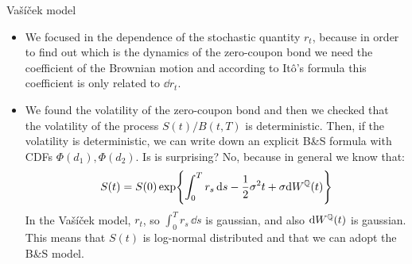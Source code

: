 \begin{example}{Vašíček model}{}{}
\begin{itemize}
        \item We focused in the dependence of the stochastic quantity $r_t$, because in order to find out which is the dynamics of the zero-coupon bond we need the coefficient of the Brownian motion and according to Itô's formula this coefficient is only related to $\dd r_t$.
        \item We found the volatility of the zero-coupon bond and then we checked that the volatility of the process $S(t)/B(t,T)$ is deterministic. Then, if the volatility is deterministic, we can write down an explicit B\&S formula with CDFs $\Phi(d_1),\Phi(d_2)$. Is is surprising? No, because in general we know that:
        \begin{equation*}
            S(t) = S(0)\exp{\int_0^T r_s\,\dd s - \frac{1}{2}\sigma^2 t + \sigma\dd W^{\mathbb{Q}}(t)}
        \end{equation*}
        In the Vašíček model, $r_t$, so $\int_0^T r_s\,\dd s$ is gaussian, and also $\dd W^{\mathbb{Q}}(t)$ is gaussian. This means that $S(t)$ is log-normal distributed and that we can adopt the B\&S model.
    \end{itemize} 
\end{example}
